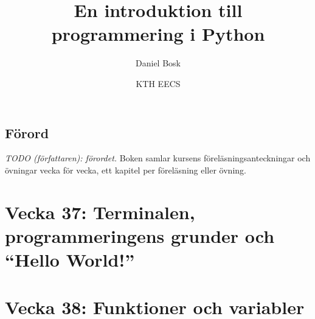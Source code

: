 
\frontmatter

\title{%
  En introduktion till programmering i Python
}
\author{Daniel Bosk}
\date{%
  KTH EECS\\[1ex]
}
\maketitle

\chapter*{Förord}

\emph{TODO (författaren): förordet.}  Boken samlar kursens
föreläsningsanteckningar och övningar vecka för vecka, ett kapitel per
föreläsning eller övning.

\clearpage
\tableofcontents*

\mainmatter

\part{Vecka 37: Terminalen, programmeringens grunder och
  \enquote{Hello World!}}



\part{Vecka 38: Funktioner och variabler}

